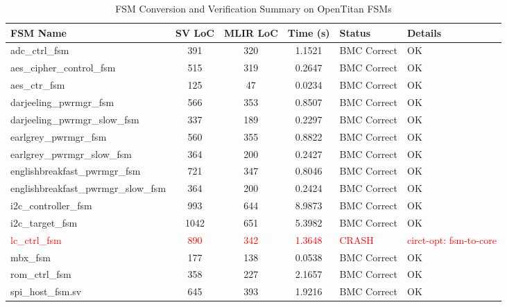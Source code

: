 \documentclass[acmsmall,screen,review]{acmart}
\begin{document}
\begin{table}[t]
\centering
\caption{FSM Conversion and Verification Summary on OpenTitan FSMs}
\label{tab:fsm_conversion}
\begin{tabular}{l S[table-format=4.0] S[table-format=3.0] S[table-format=1.4] l l}
\toprule
\textbf{FSM Name} & {\textbf{SV LoC}} & {\textbf{MLIR LoC}} & {\textbf{Time (s)}} & \textbf{Status} & \textbf{Details} \\
\midrule
adc\_ctrl\_fsm                   &  391 & 320 &  1.1521 & BMC Correct & OK \\
aes\_cipher\_control\_fsm         &  515 & 319 &  0.2647 & BMC Correct & OK \\
aes\_ctr\_fsm                    &  125 &  47 &  0.0234 & BMC Correct & OK \\
darjeeling\_pwrmgr\_fsm          &  566 & 353 &  0.8507 & BMC Correct & OK \\
darjeeling\_pwrmgr\_slow\_fsm     &  337 & 189 &  0.2297 & BMC Correct & OK \\
earlgrey\_pwrmgr\_fsm            &  560 & 355 &  0.8822 & BMC Correct & OK \\
earlgrey\_pwrmgr\_slow\_fsm       &  364 & 200 &  0.2427 & BMC Correct & OK \\
englishbreakfast\_pwrmgr\_fsm    &  721 & 347 &  0.8046 & BMC Correct & OK \\
englishbreakfast\_pwrmgr\_slow\_fsm &  364 & 200 &  0.2424 & BMC Correct & OK \\
i2c\_controller\_fsm             &  993 & 644 &  8.9873 & BMC Correct & OK \\
i2c\_target\_fsm                 & 1042 & 651 &  5.3982 & BMC Correct & OK \\
\textcolor{red}{lc\_ctrl\_fsm}   &  \textcolor{red}{890} & \textcolor{red}{342} &  \textcolor{red}{1.3648} & \textcolor{red}{CRASH}  & \textcolor{red}{circt-opt: fsm-to-core} \\
mbx\_fsm                        &  177 & 138 &  0.0538 & BMC Correct & OK \\
rom\_ctrl\_fsm                   &  358 & 227 &  2.1657 & BMC Correct & OK \\
spi\_host\_fsm.sv                &  645 & 393 &  1.9216 & BMC Correct & OK \\
\bottomrule
\end{tabular}
\end{table}
\end{document}
